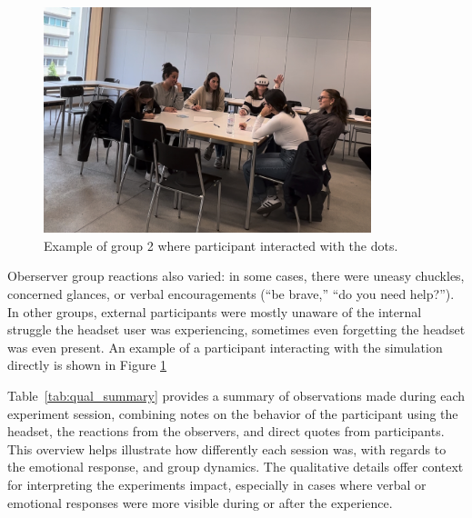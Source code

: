 \begin{figure}[H]
    \centering
    \includegraphics[width=0.85\textwidth]{../../Figures/Group-02-movingArm.jpg}
    \caption{Example of group 2 where participant interacted with the dots.}
    \label{fig:simulation-interaction}
\end{figure}

\vspace{1em}

Oberserver group reactions also varied: in some cases, there were uneasy chuckles, concerned glances, or verbal encouragements (“be brave,” “do you need help?”). In other groups, external participants were mostly unaware of the internal struggle the headset user was experiencing, sometimes even forgetting the headset was even present. An example of a participant interacting with the simulation directly is shown in Figure \ref{fig:simulation-interaction}

\vspace{1em}

Table~\ref{tab:qual_summary} provides a summary of observations made during each experiment session, combining notes on the behavior of the participant using the headset, the reactions from the observers, and direct quotes from participants. This overview helps illustrate how differently each session was, with regards to the emotional response, and group dynamics. The qualitative details offer context for interpreting the experiments impact, especially in cases where verbal or emotional responses were more visible during or after the experience.

